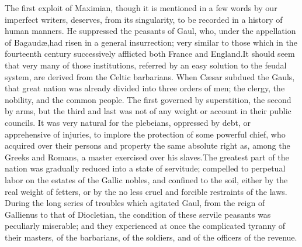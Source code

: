 The first exploit of Maximian, though it is mentioned in a few
words by our imperfect writers, deserves, from its singularity,
to be recorded in a history of human manners. He suppressed the
peasants of Gaul, who, under the appellation of Bagaudæ,\footnotemark[16] had
risen in a general insurrection; very similar to those which in
the fourteenth century successively afflicted both France and
England.\footnotemark[17] It should seem that very many of those institutions,
referred by an easy solution to the feudal system, are derived
from the Celtic barbarians. When Cæsar subdued the Gauls, that
great nation was already divided into three orders of men; the
clergy, the nobility, and the common people. The first governed
by superstition, the second by arms, but the third and last was
not of any weight or account in their public councils. It was
very natural for the plebeians, oppressed by debt, or
apprehensive of injuries, to implore the protection of some
powerful chief, who acquired over their persons and property the
same absolute right as, among the Greeks and Romans, a master
exercised over his slaves.\footnotemark[18] The greatest part of the nation was
gradually reduced into a state of servitude; compelled to
perpetual labor on the estates of the Gallic nobles, and confined
to the soil, either by the real weight of fetters, or by the no
less cruel and forcible restraints of the laws. During the long
series of troubles which agitated Gaul, from the reign of
Gallienus to that of Diocletian, the condition of these servile
peasants was peculiarly miserable; and they experienced at once
the complicated tyranny of their masters, of the barbarians, of
the soldiers, and of the officers of the revenue.\footnotemark[19]





